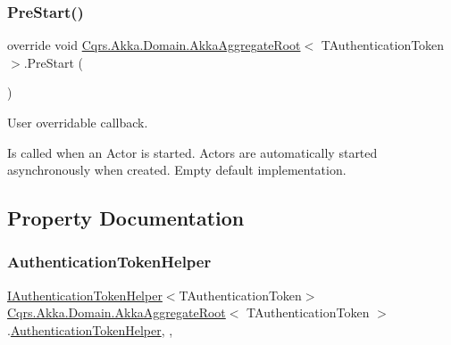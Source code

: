 \subsubsection{\texorpdfstring{Pre\+Start()}{PreStart()}}
{\footnotesize\ttfamily override void \hyperlink{classCqrs_1_1Akka_1_1Domain_1_1AkkaAggregateRoot}{Cqrs.\+Akka.\+Domain.\+Akka\+Aggregate\+Root}$<$ T\+Authentication\+Token $>$.Pre\+Start (\begin{DoxyParamCaption}{ }\end{DoxyParamCaption})\hspace{0.3cm}{\ttfamily [protected]}}



User overridable callback. 

Is called when an Actor is started. Actors are automatically started asynchronously when created. Empty default implementation. 



\subsection{Property Documentation}
\mbox{\label{classCqrs_1_1Akka_1_1Domain_1_1AkkaAggregateRoot_a3a73139fe47221bd579949e978d0126d_a3a73139fe47221bd579949e978d0126d}} 
\subsubsection{\texorpdfstring{Authentication\+Token\+Helper}{AuthenticationTokenHelper}}
{\footnotesize\ttfamily \hyperlink{interfaceCqrs_1_1Authentication_1_1IAuthenticationTokenHelper}{I\+Authentication\+Token\+Helper}$<$T\+Authentication\+Token$>$ \hyperlink{classCqrs_1_1Akka_1_1Domain_1_1AkkaAggregateRoot}{Cqrs.\+Akka.\+Domain.\+Akka\+Aggregate\+Root}$<$ T\+Authentication\+Token $>$.\hyperlink{classCqrs_1_1Authentication_1_1AuthenticationTokenHelper}{Authentication\+Token\+Helper}\hspace{0.3cm}{\ttfamily [get]}, {\ttfamily [set]}, {\ttfamily [protected]}}

